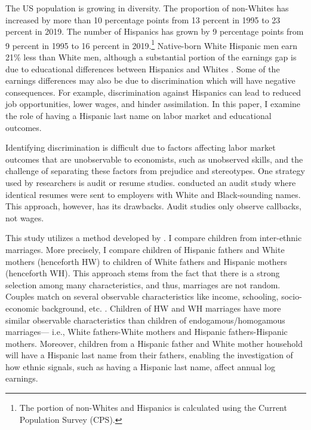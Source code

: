 \documentclass[a4paper,fleqn]{cas-sc}
\begin{document}
The US population is growing in diversity. The proportion of non-Whites has increased by more than 10 percentage points from 13 percent in 1995 to 23 percent in 2019. The number of Hispanics has grown by 9 percentage points from 9 percent in 1995 to 16 percent in 2019.\footnote{The portion of non-Whites and Hispanics is calculated using the Current Population Survey (CPS).} Native-born White Hispanic men earn 21\% less than White men, although a substantial portion of the earnings gap is due to educational differences between Hispanics and Whites \citep{duncan2006hispanics, duncan2018identifying, duncan2018socioeconomic}. Some of the earnings differences may also be due to discrimination which will have negative consequences. For example, discrimination against Hispanics can lead to reduced job opportunities, lower wages, and hinder assimilation. In this paper, I examine the role of having a Hispanic last name on labor market and educational outcomes. 

Identifying discrimination is difficult due to factors affecting labor market outcomes that are unobservable to economists, such as unobserved skills, and the challenge of separating these factors from prejudice and stereotypes. One strategy used by researchers is audit or resume studies. \citet{bertrand2004emily} conducted an audit study where identical resumes were sent to employers with White and Black-sounding names. This approach, however, has its drawbacks. Audit studies only observe callbacks, not wages. 

This study utilizes a method developed by \citet{rubinstein2014pride}. I compare children from inter-ethnic marriages. More precisely, I compare children of Hispanic fathers and White mothers (henceforth HW) to children of White fathers and Hispanic mothers (henceforth  WH). This approach stems from the fact that there is a strong selection among many characteristics, and thus, marriages are not random. Couples match on several observable characteristics like income, schooling, socio-economic background, etc. \citep{averettBetterWorseRelationship2008, averettEconomicRealityBeauty1996, beckerTheoryMarriagePart1973, beckerTheoryMarriagePart1974, beckerTreatiseFamily1993, browningCollectiveUnitaryModels2006, chiapporiFatterAttractionAnthropometric2012}. Children of HW and WH marriages have more similar observable characteristics than children of endogamous/homogamous marriages--- i.e., White fathers-White mothers and Hispanic fathers-Hispanic mothers. Moreover, children from a Hispanic father and White mother household will have a Hispanic last name from their fathers, enabling the investigation of how ethnic signals, such as having a Hispanic last name, affect annual log earnings.
\end{document}
